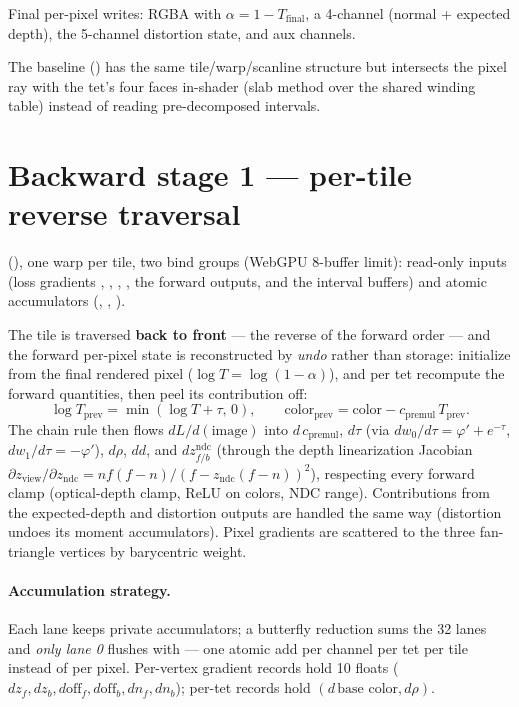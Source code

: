 Final per-pixel writes:  RGBA with
$\alpha = 1 - T_{\text{final}}$, a 4-channel 
(normal + expected depth), the 5-channel distortion state, and aux channels.

The baseline 
() has the same tile/warp/scanline structure
but intersects the pixel ray with the tet's four faces in-shader (slab
method over the shared  winding table) instead of reading
pre-decomposed intervals.

\section{Backward stage 1 --- per-tile reverse traversal}

 (),
one warp per tile, two bind groups (WebGPU 8-buffer limit): read-only inputs
(loss gradients , ,
, , the forward outputs, and the
interval buffers) and atomic accumulators
(, , ).

The tile is traversed \textbf{back to front} --- the reverse of the forward
order --- and the forward per-pixel state is reconstructed by \emph{undo}
rather than storage: initialize from the final rendered pixel
($\log T = \log(1-\alpha)$), and per tet recompute the forward quantities,
then peel its contribution off:
\[
  \log T_{\text{prev}} = \min(\log T + \tau,\, 0), \qquad
  \text{color}_{\text{prev}} = \text{color} - c_{\text{premul}}\,
  T_{\text{prev}} .
\]
The chain rule then flows $dL/d(\text{image})$ into
$d\,c_{\text{premul}}$, $d\tau$ (via
$d w_0/d\tau = \varphi' + e^{-\tau}$, $d w_1/d\tau = -\varphi'$),
$d\rho$, $d d$, and $d z^{\text{ndc}}_{f/b}$ (through the depth
linearization Jacobian
$\partial z_{\text{view}} / \partial z_{\text{ndc}} =
n f (f-n) / (f - z_{\text{ndc}} (f-n))^2$), respecting every forward clamp
(optical-depth clamp, ReLU on colors, NDC range). Contributions from the
expected-depth and distortion outputs are handled the same way (distortion
undoes its moment accumulators). Pixel gradients are scattered to the three
fan-triangle vertices by barycentric weight.

\paragraph{Accumulation strategy.} Each lane keeps private accumulators;
a butterfly  reduction sums the 32 lanes and
\emph{only lane 0} flushes with  --- one atomic add per
channel per tet per tile instead of per pixel. Per-vertex gradient records
hold 10 floats
($dz_f, dz_b, d\text{off}_f, d\text{off}_b, d n_f, d n_b$); per-tet records
hold $(d\,\text{base color}, d\rho)$.

